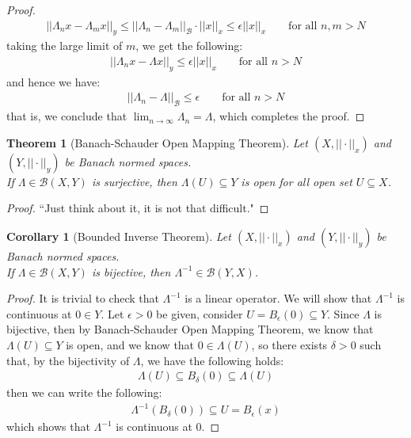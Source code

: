 \documentclass[11pt]{book}
\theoremstyle{break}
\theoremstyle{break}
\newtheorem{thm}{Theorem}[section]
\newtheorem{corT}[lem]{Corollary}
\begin{document}
\begin{proof}
\begin{align*}
||\Lambda_n x - \Lambda_m x||_y \leq ||\Lambda_n - \Lambda_m||_{\mathcal{B}}\cdot ||x||_x \leq \epsilon ||x||_x \qquad \text{for all }n,m >N
\end{align*}
taking the large limit of $m$, we get the following:
\begin{align*}
||\Lambda_n x - \Lambda x||_{y} \leq \epsilon ||x||_x  \qquad \text{for all }n >N
\end{align*}
and hence we have:
\begin{align*}
||\Lambda_n - \Lambda||_{\mathcal{B}}\leq \epsilon \qquad \text{for all }n >N
\end{align*}
that is, we conclude that $\lim_{n\to \infty}\Lambda_n = \Lambda$, which completes the proof.
\end{proof}

\begin{thm}[Banach-Schauder Open Mapping Theorem]
Let $(X, ||\cdot ||_x)$ and $(Y, ||\cdot ||_y)$ be Banach normed spaces. \\
If $\Lambda \in \mathcal{B}(X,Y)$ is surjective, then $\Lambda(U) \subseteq Y$ is open for all open set $U \subseteq X$.  
\end{thm}
\begin{proof}
``Just think about it, it is not that difficult."
\end{proof}


\begin{corT}[Bounded Inverse Theorem]
Let $(X, ||\cdot ||_x)$ and $(Y, ||\cdot ||_y)$ be Banach normed spaces. \\
If $\Lambda\in \mathcal{B}(X,Y)$ is bijective, then $\Lambda^{-1} \in \mathcal{B}(Y,X)$. 
\end{corT}
\begin{proof}
It is trivial to check that $\Lambda^{-1}$ is a linear operator. We will show that $\Lambda^{-1}$ is continuous at $0\in Y$. Let $\epsilon>0$ be given, consider $U = B_\epsilon(0) \subseteq Y$. Since $\Lambda$ is bijective, then by Banach-Schauder Open Mapping Theorem, we know that $\Lambda(U) \subseteq Y$ is open, and we know that $0 \in \Lambda(U)$, so there exists $\delta >0$ such that, by the bijectivity of $\Lambda$, we have the following holds:
\begin{align*}
\Lambda(U)\subseteq  B_\delta(0) \subseteq \Lambda(U)
\end{align*}
then we can write the following:
\begin{align*}
\Lambda^{-1}(B_\delta(0)) \subseteq U = B_\epsilon(x)
\end{align*}
which shows that $\Lambda^{-1}$ is continuous at $0$. 
\end{proof}
\end{document}
